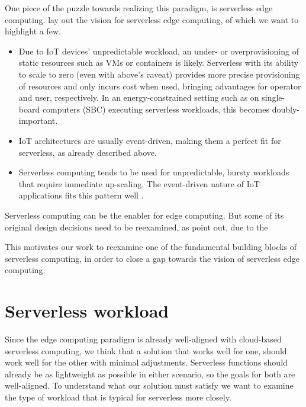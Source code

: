 One piece of the puzzle towards realizing this paradigm, is serverless edge computing. \citeauthor{Aslanpour2021} lay out the vision for serverless edge computing, of which we want to highlight a few.

\begin{itemize}
    \item Due to IoT devices' unpredictable workload, an under- or overprovisioning of static resources such as VMs or containers is likely. Serverless with its ability to scale to zero (even with above's caveat) provides more precise provisioning of resources and only incurs cost when used, bringing advantages for operator and user, respectively. In an energy-constrained setting such as on single-board computers (SBC) executing serverless workloads, this becomes doubly-important.
    \item IoT architectures are usually event-driven, making them a perfect fit for serverless, as already described above.
    \item Serverless computing tends to be used for unpredictable, bursty workloads that require immediate up-scaling. The event-driven nature of IoT applications fits this pattern well \cite{Aslanpour2021}.
\end{itemize}

Serverless computing can be the enabler for edge computing. But some of its original design decisions need to be reexamined, as \citeauthor{Nastic2018} point out, due to the

\begin{quote}
\end{quote}

This motivates our work to reexamine one of the fundamental building blocks of serverless computing, in order to close a gap towards the vision of serverless edge computing.

\section{Serverless workload}
\label{section:serverless_workload}

Since the edge computing paradigm is already well-aligned with cloud-based serverless computing, we think that a solution that works well for one, should work well for the other with minimal adjustments. Serverless functions should already be as lightweight as possible in either scenario, so the goals for both are well-aligned.
To understand what our solution must satisfy we want to examine the type of workload that is typical for serverless more closely.

